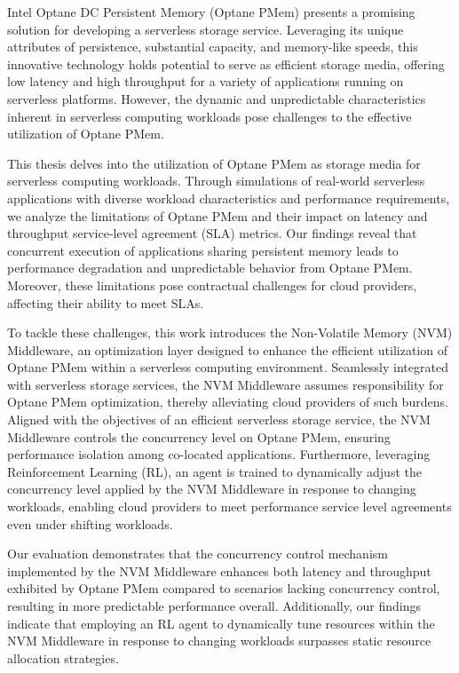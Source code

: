 \documentclass[11pt]{report}
\begin{document}

\tableofcontents

\listoftables

\listoffigures

\abstractpage

Intel Optane DC Persistent Memory (Optane PMem) presents a promising solution for developing a serverless storage service. Leveraging its unique attributes of persistence, substantial capacity, and memory-like speeds, this innovative technology holds potential to serve as efficient storage media, offering low latency and high throughput for a variety of applications running on serverless platforms. However, the dynamic and unpredictable characteristics inherent in serverless computing workloads pose challenges to the effective utilization of Optane PMem.

This thesis delves into the utilization of Optane PMem as storage media for serverless computing workloads. Through simulations of real-world serverless applications with diverse workload characteristics and performance requirements, we analyze the limitations of Optane PMem and their impact on latency and throughput service-level agreement (SLA) metrics. Our findings reveal that concurrent execution of applications sharing persistent memory leads to performance degradation and unpredictable behavior from Optane PMem. Moreover, these limitations pose contractual challenges for cloud providers, affecting their ability to meet SLAs.

To tackle these challenges, this work introduces the Non-Volatile Memory (NVM) Middleware, an optimization layer designed to enhance the efficient utilization of Optane PMem within a serverless computing environment. Seamlessly integrated with serverless storage services, the NVM Middleware assumes responsibility for Optane PMem optimization, thereby alleviating cloud providers of such burdens. Aligned with the objectives of an efficient serverless storage service, the NVM Middleware controls the concurrency level on Optane PMem, ensuring performance isolation among co-located applications. Furthermore, leveraging Reinforcement Learning (RL), an agent is trained to dynamically adjust the concurrency level applied by the NVM Middleware in response to changing workloads, enabling cloud providers to meet performance service level agreements even under shifting workloads.

Our evaluation demonstrates that the concurrency control mechanism implemented by the NVM Middleware enhances both latency and throughput exhibited by Optane PMem compared to scenarios lacking concurrency control, resulting in more predictable performance overall. Additionally, our findings indicate that employing an RL agent to dynamically tune resources within the NVM Middleware in response to changing workloads surpasses static resource allocation strategies.
\end{document}
